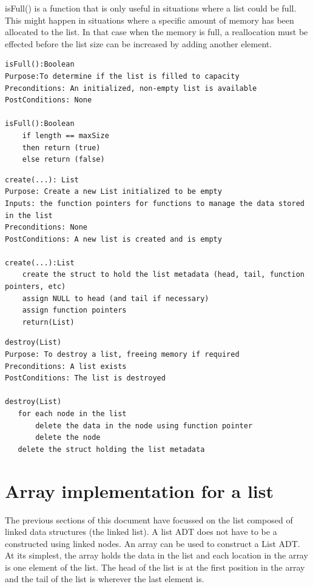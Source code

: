 isFull() is a function that is only useful in situations where a list could be 
       full.  This might happen in situations where a specific amount of memory 
       has been allocated to the list.  In that case when the memory is full,  
       a reallocation must be effected before the list size can be increased by 
       adding another element.
\begin{lstlisting}
isFull():Boolean
Purpose:To determine if the list is filled to capacity
Preconditions: An initialized, non-empty list is available
PostConditions: None
   
isFull():Boolean
    if length == maxSize
    then return (true)
    else return (false)
\end{lstlisting}
       

\begin{lstlisting}
create(...): List
Purpose: Create a new List initialized to be empty
Inputs: the function pointers for functions to manage the data stored in the list
Preconditions: None
PostConditions: A new list is created and is empty

create(...):List
    create the struct to hold the list metadata (head, tail, function pointers, etc)
    assign NULL to head (and tail if necessary)
    assign function pointers
    return(List)
\end {lstlisting}


\begin{lstlisting}
destroy(List)
Purpose: To destroy a list, freeing memory if required
Preconditions: A list exists
PostConditions: The list is destroyed

destroy(List)
   for each node in the list
       delete the data in the node using function pointer
       delete the node
   delete the struct holding the list metadata
\end{lstlisting}
   




\section{Array implementation for a list}

The previous sections of this document have focussed on the list composed of linked data structures (the linked list).   A list ADT does not have to be a constructed using linked nodes.   An array can be used to construct a List ADT. At its simplest, the array holds the data in the list and each location in the array is one element of the list. The head of the list is at the first position in the array and the tail of the list is wherever the last element is.  

